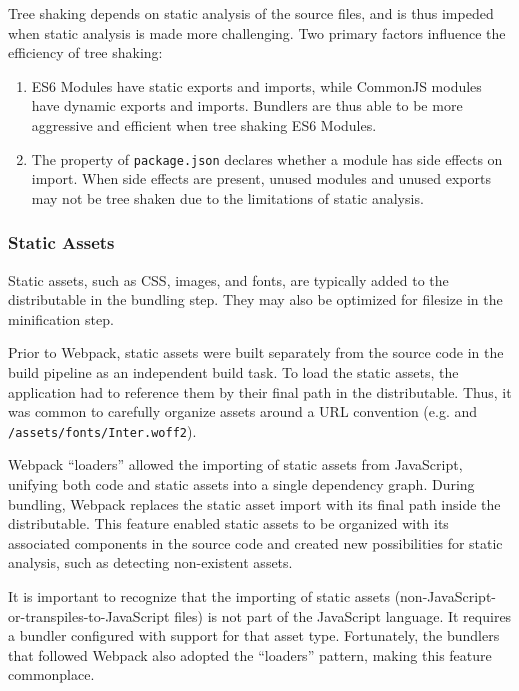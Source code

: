 \documentclass{article}
\begin{document}
Tree shaking depends on static analysis of the source files, and is thus impeded when static
analysis is made more challenging. Two primary factors influence the efficiency of tree shaking:

\begin{enumerate}
  \item {} ES6 Modules have static exports and imports, while CommonJS modules have
    dynamic exports and imports. Bundlers are thus able to be more aggressive and efficient when
    tree shaking ES6 Modules.

  \item {} The  property of \texttt{package.json} declares whether a
    module has side effects on import. When side effects are present, unused modules and unused
    exports may not be tree shaken due to the limitations of static analysis.
\end{enumerate}

\subsubsection{Static Assets}

Static assets, such as CSS, images, and fonts, are typically added to the distributable in the
bundling step. They may also be optimized for filesize in the minification step.

Prior to Webpack, static assets were built separately from the source code in the build pipeline as
an independent build task. To load the static assets, the application had to reference them by their
final path in the distributable. Thus, it was common to carefully organize assets around a URL
convention (e.g.  and \texttt{/assets/fonts/Inter.woff2}).

Webpack ``loaders'' allowed the importing of static assets from JavaScript, unifying both code and
static assets into a single dependency graph. During bundling, Webpack replaces the static asset
import with its final path inside the distributable. This feature enabled static assets to be
organized with its associated components in the source code and created new possibilities for static
analysis, such as detecting non-existent assets.

It is important to recognize that the importing of static assets
(non-JavaScript-or-transpiles-to-JavaScript files) is not part of the JavaScript language. It
requires a bundler configured with support for that asset type. Fortunately, the bundlers that
followed Webpack also adopted the ``loaders'' pattern, making this feature commonplace.
\end{document}
